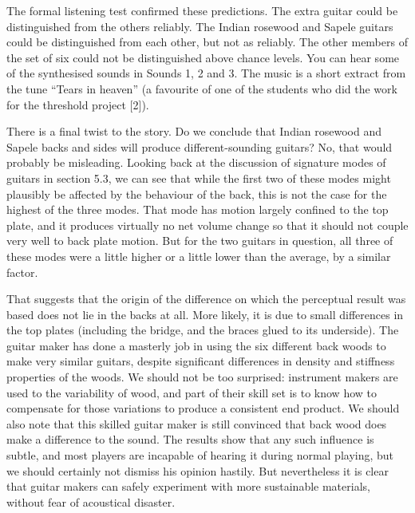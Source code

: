   The formal listening test confirmed these predictions. The extra guitar could 
  be distinguished from the others reliably. The Indian rosewood and Sapele 
  guitars could be distinguished from each other, but not as reliably. The 
  other members of the set of six could not be distinguished above chance 
  levels. You can hear some of the synthesised sounds in Sounds 1, 2 and 3. The 
  music is a short extract from the tune “Tears in heaven” (a favourite of one 
  of the students who did the work for the threshold project [2]). 




  There is a final twist to the story. Do we conclude that Indian rosewood and 
  Sapele backs and sides will produce different-sounding guitars? No, that 
  would probably be misleading. Looking back at the discussion of signature 
  modes of guitars in section 5.3, we can see that while the first two of these 
  modes might plausibly be affected by the behaviour of the back, this is not 
  the case for the highest of the three modes. That mode has motion largely 
  confined to the top plate, and it produces virtually no net volume change so 
  that it should not couple very well to back plate motion. But for the two 
  guitars in question, all three of these modes were a little higher or a 
  little lower than the average, by a similar factor. 

  That suggests that the origin of the difference on which the perceptual 
  result was based does not lie in the backs at all. More likely, it is due to 
  small differences in the top plates (including the bridge, and the braces 
  glued to its underside). The guitar maker has done a masterly job in using 
  the six different back woods to make very similar guitars, despite 
  significant differences in density and stiffness properties of the woods. We 
  should not be too surprised: instrument makers are used to the variability of 
  wood, and part of their skill set is to know how to compensate for those 
  variations to produce a consistent end product. We should also note that this 
  skilled guitar maker is still convinced that back wood does make a difference 
  to the sound. The results show that any such influence is subtle, and most 
  players are incapable of hearing it during normal playing, but we should 
  certainly not dismiss his opinion hastily. But nevertheless it is clear that 
  guitar makers can safely experiment with more sustainable materials, without 
  fear of acoustical disaster. 

